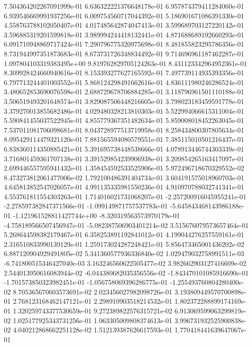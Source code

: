 7.504364202267091999e-01
6.636322221376648178e-01
6.957874379411284060e-01
6.939546669991937256e-01
6.009754560717044392e-01
5.186901671086391330e-01
4.558763788102050407e-01
4.017485642874047413e-01
3.599689703127220142e-01
3.596885319201599818e-01
3.989994244418132441e-01
4.871688689192660293e-01
6.091710948869717424e-01
7.290796775320975698e-01
8.481855823295786356e-01
8.731944997351873683e-01
8.673731726348834492e-01
9.714696961187462287e-01
1.097804103319383495e+00
9.819762829705124263e-01
8.431123342964952361e-01
8.309928424660940616e-01
8.153393277627165592e-01
7.497739114935393356e-01
6.797713244401003552e-01
5.868124298491662616e-01
4.836111980246286524e-01
3.480652853690076598e-01
2.688729678706884285e-01
3.118796961501110188e-01
3.506519493201648574e-01
3.829087506448216605e-01
3.798023183459591778e-01
3.379270013855682486e-01
4.029480328213810303e-01
5.522994066615311004e-01
5.590841455037522945e-01
4.855779367351482634e-01
5.859008018452263045e-01
7.537011081706098681e-01
8.043728977513719958e-01
8.258434800307805634e-01
8.095429114479321120e-01
7.881565594080579551e-01
7.385115010501216437e-01
6.838360114350885421e-01
5.391695738448538666e-01
4.078913446744303339e-01
3.716801459361707138e-01
3.391529854239906938e-01
3.209854265163417097e-01
2.699446557595941432e-01
1.358454592533525906e-01
5.972496718670329552e-02
8.473273812061477006e-02
1.792100486391404734e-01
3.604191575018960703e-01
4.645813852547026057e-01
4.991135335981550236e-01
4.910970788032741341e-01
4.553761811554303263e-01
1.714016021731068207e-01
-2.257200916045955241e-01
-2.278597382847371566e-01
-1.099149871757537783e-01
-5.645843468143986188e-01
-1.121961528811427744e+00
-8.320319563573970179e-01
-4.758189566507456947e-01
-5.082387506903401214e-02
3.515676079573657464e-01
5.268644598382179467e-01
6.358253891192841012e-01
4.199044276257559161e-01
2.316510833990139129e-01
1.259173024287248421e-01
5.856473465001436202e-02
6.887120904929491805e-02
5.341360577936336840e-02
1.029479032758991511e-03
-6.741800515346427040e-03
3.163246560622505477e-02
3.982662903127416609e-02
2.544013950616083944e-02
-6.044380682035356556e-02
-1.843470101085916690e-01
-1.701573850323982451e-01
-1.056758069396286775e-01
-1.255493760804280400e-02
8.705365670603573691e-02
2.023456027982098726e-01
3.193809449570700898e-01
2.768123168462147121e-01
2.298910903518214532e-01
1.802372288899174169e-01
1.320259743377530659e-01
9.272389822576315721e-02
6.913069599063299819e-02
1.025177925343731256e-01
1.063305009808374613e-01
3.996731932525900838e-02
4.040212868662251128e-02
1.512139387626617593e-01
1.770418441639647067e-01
